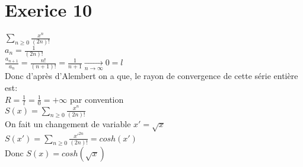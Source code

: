 \documentclass{article}
\author{Frederic Becerril}
\newcommand{\mylim}[2]{\underset{#1 \rightarrow #2}{\longrightarrow}}
\begin{document}
\part*{Exerice 10}

$\sum_{n \geq 0} \frac{x^n}{(2n)!}$\\
$a_n = \frac{1}{(2n)!}$\\
$\frac{a_{n + 1}}{a_n} = \frac{n!}{(n + 1)!} = \frac{1}{n + 1} \mylim{n}{\infty} 0 = l$\\
Donc d'après d'Alembert on a que, le rayon de convergence de cette série entière est:\\
$R = \frac{1}{l} = \frac{1}{0} = +\infty$ par convention\\
$S(x) = \sum_{n \geq 0} \frac{x^n}{(2n)!}$\\
On fait un changement de variable $x' = \sqrt{x}$\\
$S(x') = \sum_{n \geq 0} \frac{x'^{2n}}{(2n)!} = cosh(x')$\\
Donc  $S(x) = cosh(\sqrt{x})$\\
\end{document}
